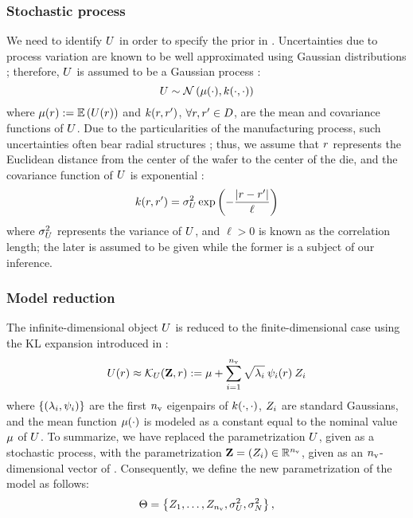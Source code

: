 \subsubsection{Stochastic process}
We need to identify $U$ in order to specify the prior in . Uncertainties due to process variation are known to be well approximated using Gaussian distributions \cite{srivastava2010}; therefore, $U$ is assumed to be a Gaussian process \cite{rasmussen2006}:
\[
  \U \sim \gaussian{\fMean{\cdot}}{\fCov{\cdot, \cdot}}
\]
where $\fMean{\r} := \E{\U(\r)}$ and $\fCov{\r, \r'}$, $\forall r, r' \in D$, are the mean and covariance functions of $U$. Due to the particularities of the manufacturing process, such uncertainties often bear radial structures \cite{cheng2011}; thus, we assume that $r$ represents the Euclidean distance from the center of the wafer to the center of the die, and the covariance function of $U$ is exponential \cite{maitre2010}:
\begin{equation} \elabel{covariance-function}
  \fCov{\r, \r'} = \param_\U^2 \exp\left(-\frac{\abs{\r - \r'}}{\ell}\right)
\end{equation}
where $\sigma_U^2$ represents the variance of $U$, and $\ell > 0$ is known as the correlation length; the later is assumed to be given while the former is a subject of our inference.

\subsubsection{Model reduction}
The infinite-dimensional object $U$ is reduced to the finite-dimensional case using the KL expansion introduced in :
\begin{equation} \elabel{kl-approximation}
  \U(\r) \approx \klapprox{\U}{\vZ, \r} := \fMean + \sum_{i = 1}^\nvars \sqrt{\lambda_i} \: \klb_i(\r) \: \Z_i
\end{equation}
where $\{ (\lambda_i, \psi_i) \}$ are the first ${n_\text{v}}$ eigenpairs of $\fCov{\cdot, \cdot}$, $Z_i$ are standard Gaussians, and the mean function $\fMean{\cdot}$ is modeled as a constant equal to the nominal value $\fMean$ of $U$. To summarize, we have replaced the parametrization $U$, given as a stochastic process, with the parametrization $\mathbf{Z} = (Z_i) \in \mathbb{R}^{n_\text{v}}$, given as an ${n_\text{v}}$-dimensional vector of \rvs. Consequently, we define the new parametrization of the model as follows:
\[
  \Theta = \left\{ Z_1, \dotsc, Z_{n_\text{v}}, \sigma^2_U, \sigma^2_N \right\},
\]

